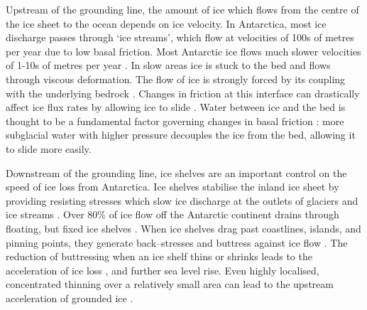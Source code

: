 
Upstream of the grounding line, the amount of ice which flows from the centre of the ice sheet to the ocean depends on ice velocity.  In Antarctica, most ice discharge passes through `ice streams', which flow at velocities of 100s of metres per year \citep{rignot2011ice} due to low basal friction. Most Antarctic ice flows much slower velocities of 1-10s of metres per year \citep{rignot2011ice, morlighem2013inversion}. In slow areas ice is stuck to the bed and flows through viscous deformation.
The flow of ice is strongly forced by its coupling with the underlying bedrock \citep[e.g.][]{rose1979characteristics,engelhardt1990physical}. Changes in friction at this interface can drastically affect ice flux rates by allowing ice to slide \citep{budd1979empirical}. 
Water between ice and the bed is thought to be a fundamental factor governing changes in basal friction \citep{weertman1957sliding,iken1986combined, alley1989water}:
more subglacial water with higher pressure decouples the ice from the bed, allowing it to slide more easily. 

Downstream of the grounding line, ice shelves  are an important control on the speed of ice loss from Antarctica. Ice shelves stabilise the inland ice sheet by  providing resisting stresses which slow ice discharge at the outlets of glaciers and ice streams \citep{dupont2005assessment}. Over 80\% of ice flow off the Antarctic continent drains through floating, but fixed ice shelves \citep{pritchard2012antarctic}. When ice shelves drag past coastlines, islands, and pinning points, they generate back--stresses and buttress against ice flow \citep{dupont2005assessment, furst2016safety}.   The reduction of buttressing when an ice shelf thins or shrinks leads to the acceleration of ice loss \citep{rignot2004accelerated, berthier2012mass}, and further sea level rise. Even highly localised, concentrated thinning over a relatively small area can lead to the upstream acceleration of grounded ice \citep{reese2018far}.


